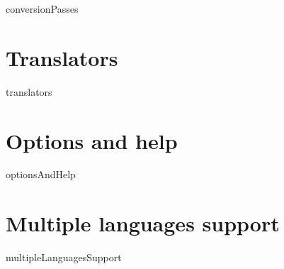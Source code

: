 \documentclass[12pt,a4paper]{article}
\begin{document}
{conversionPasses}


\newpage

\section{Translators}

{translators}


\newpage

\section{Options and help}

{optionsAndHelp}


\section{Multiple languages support}

{multipleLanguagesSupport}


\end{document}
